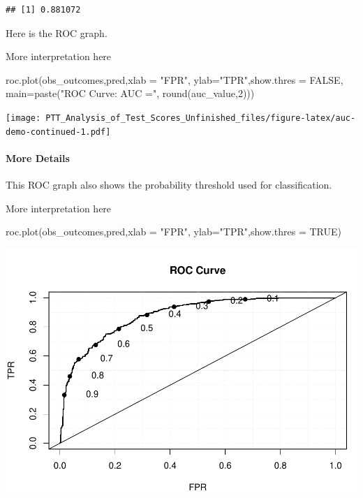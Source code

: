 \documentclass[
]{article}
\newenvironment{Shaded}{\begin{snugshade}}{\end{snugshade}}
\newcommand{\AttributeTok}[1]{\textcolor[rgb]{0.77,0.63,0.00}{#1}}
\newcommand{\ConstantTok}[1]{\textcolor[rgb]{0.00,0.00,0.00}{#1}}
\newcommand{\DecValTok}[1]{\textcolor[rgb]{0.00,0.00,0.81}{#1}}
\newcommand{\FunctionTok}[1]{\textcolor[rgb]{0.00,0.00,0.00}{#1}}
\newcommand{\NormalTok}[1]{#1}
\newcommand{\StringTok}[1]{\textcolor[rgb]{0.31,0.60,0.02}{#1}}
\begin{document}
\begin{verbatim}
## [1] 0.881072
\end{verbatim}

Here is the ROC graph.

More interpretation here

\begin{Shaded}
\begin{Highlighting}[]
\FunctionTok{roc.plot}\NormalTok{(obs\_outcomes,pred,}\AttributeTok{xlab =} \StringTok{"FPR"}\NormalTok{, }\AttributeTok{ylab=}\StringTok{"TPR"}\NormalTok{,}\AttributeTok{show.thres =} \ConstantTok{FALSE}\NormalTok{,}
         \AttributeTok{main=}\FunctionTok{paste}\NormalTok{(}\StringTok{"ROC Curve: AUC ="}\NormalTok{, }\FunctionTok{round}\NormalTok{(auc\_value,}\DecValTok{2}\NormalTok{)))}
\end{Highlighting}
\end{Shaded}

\texttt{[image: PTT\_Analysis\_of\_Test\_Scores\_Unfinished\_files/figure-latex/auc-demo-continued-1.pdf]}

\hypertarget{more-details}{%
\paragraph{More Details}\label{more-details}}

This ROC graph also shows the probability threshold used for
classification.

More interpretation here

\begin{Shaded}
\begin{Highlighting}[]
\FunctionTok{roc.plot}\NormalTok{(obs\_outcomes,pred,}\AttributeTok{xlab =} \StringTok{"FPR"}\NormalTok{, }\AttributeTok{ylab=}\StringTok{"TPR"}\NormalTok{,}\AttributeTok{show.thres =} \ConstantTok{TRUE}\NormalTok{)}
\end{Highlighting}
\end{Shaded}

\includegraphics{PTT_Analysis_of_Test_Scores_Unfinished_files/figure-latex/auc-demo-threshold-1.pdf}
\end{document}
